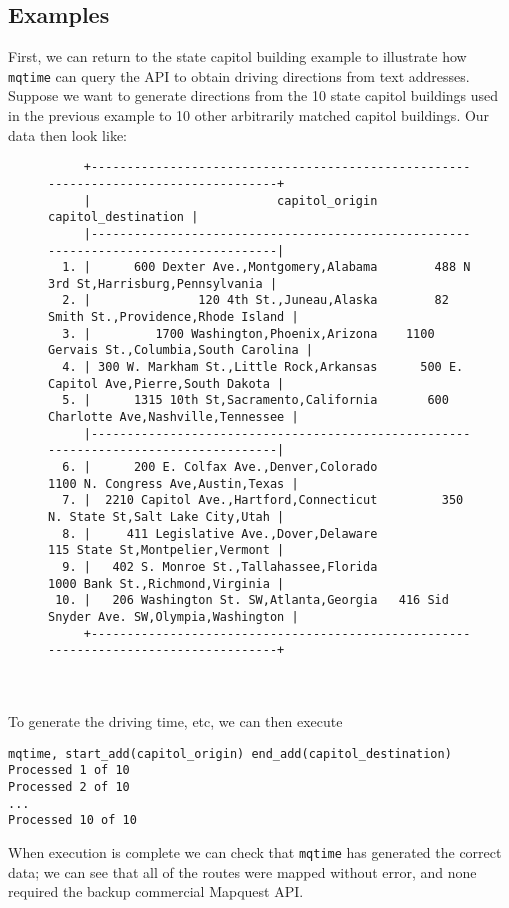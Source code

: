 \documentclass[12pt]{article}
\begin{document}
\subsection{Examples}
First, we can return to the state capitol building example to illustrate how \verb|mqtime| can query the API to obtain driving directions from text addresses. Suppose we want to generate directions from the 10 state capitol buildings used in the previous example to 10 other arbitrarily matched capitol buildings. Our data then look like:
\begin{figure}[ht]
{\footnotesize
\begin{verbatim}
     +-------------------------------------------------------------------------------------+
     |                          capitol_origin                         capitol_destination |
     |-------------------------------------------------------------------------------------|
  1. |      600 Dexter Ave.,Montgomery,Alabama        488 N 3rd St,Harrisburg,Pennsylvania |
  2. |               120 4th St.,Juneau,Alaska        82 Smith St.,Providence,Rhode Island |
  3. |         1700 Washington,Phoenix,Arizona    1100 Gervais St.,Columbia,South Carolina |
  4. | 300 W. Markham St.,Little Rock,Arkansas      500 E. Capitol Ave,Pierre,South Dakota |
  5. |      1315 10th St,Sacramento,California       600 Charlotte Ave,Nashville,Tennessee |
     |-------------------------------------------------------------------------------------|
  6. |      200 E. Colfax Ave.,Denver,Colorado           1100 N. Congress Ave,Austin,Texas |
  7. |  2210 Capitol Ave.,Hartford,Connecticut         350 N. State St,Salt Lake City,Utah |
  8. |     411 Legislative Ave.,Dover,Delaware             115 State St,Montpelier,Vermont |
  9. |   402 S. Monroe St.,Tallahassee,Florida             1000 Bank St.,Richmond,Virginia |
 10. |   206 Washington St. SW,Atlanta,Georgia   416 Sid Snyder Ave. SW,Olympia,Washington |
     +-------------------------------------------------------------------------------------+
\end{verbatim}
}
\end{figure}
\\ \\
To generate the driving time, etc, we can then execute
\begin{center}
\begin{verbatim}
mqtime, start_add(capitol_origin) end_add(capitol_destination)
Processed 1 of 10
Processed 2 of 10
...
Processed 10 of 10
\end{verbatim}
\end{center}
When execution is complete we can check that \verb|mqtime| has generated the correct data; we can see that all of the routes were mapped without error, and none required the backup commercial Mapquest API.
\end{document}
